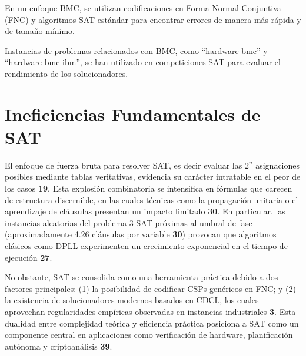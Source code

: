 En un enfoque BMC, se utilizan codificaciones en Forma Normal Conjuntiva (FNC) y algoritmos SAT estándar para encontrar errores de manera más rápida y de tamaño mínimo.  %

Instancias de problemas relacionados con BMC, como ``hardware-bmc'' y ``hardware-bmc-ibm'', se han utilizado en competiciones SAT para evaluar el rendimiento de los solucionadores. %

\section{Ineficiencias Fundamentales de SAT}
\label{sec:ineficiencia-sat}

El enfoque de fuerza bruta para resolver SAT, es decir evaluar las $2^n$ asignaciones posibles mediante tablas veritativas, evidencia su car\'acter intratable en el peor de los casos \textbf{19}. Esta explosi\'on combinatoria se intensifica en f\'ormulas que carecen de estructura discernible, en las cuales t\'ecnicas como la propagaci\'on unitaria o el aprendizaje de cl\'ausulas presentan un impacto limitado \textbf{30}. En particular, las instancias aleatorias del problema 3-SAT pr\'oximas al umbral de fase (aproximadamente 4.26 cl\'ausulas por variable \textbf{30}) provocan que algoritmos cl\'asicos como DPLL experimenten un crecimiento exponencial en el tiempo de ejecuci\'on \textbf{27}.

No obstante, SAT se consolida como una herramienta pr\'actica debido a dos factores principales: (1) la posibilidad de codificar CSPs gen\'ericos en FNC; y (2) la existencia de solucionadores modernos basados en CDCL, los cuales aprovechan regularidades emp\'iricas observadas en instancias industriales \textbf{3}. Esta dualidad entre complejidad te\'orica y eficiencia pr\'actica posiciona a SAT como un componente central en aplicaciones como verificaci\'on de hardware, planificaci\'on aut\'onoma y criptoan\'alisis \textbf{39}.




